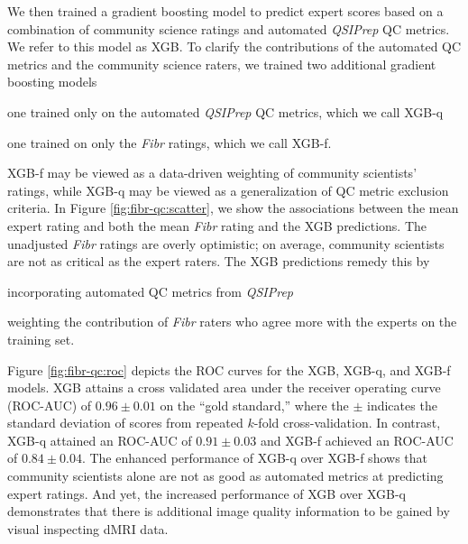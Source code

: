 \documentclass[fleqn,10pt]{wlscirep}
\begin{document}
We then trained a gradient boosting model \cite{chen2016-eb} to predict expert
scores based on a combination of community science ratings and automated \emph{QSIPrep}
QC metrics. We refer to this model as XGB.  To clarify the contributions of the
automated QC metrics and the community science raters, we trained two additional
gradient boosting models
\begin{enumerate*}[%
    label=(\roman*),%
    before=\unskip{: },%
    itemjoin={{, }},%
    itemjoin*={{ and }}]
    \item one trained only on the automated \emph{QSIPrep} QC metrics, which we
    call XGB-q
    \item one trained on only the \emph{Fibr} ratings, which we call XGB-f.
\end{enumerate*}
XGB-f may be viewed as a data-driven weighting of community scientists' ratings,
while XGB-q may be viewed as a generalization of QC metric exclusion criteria.
In Figure \ref{fig:fibr-qc:scatter}, we show the associations between the mean
expert rating and both the mean \emph{Fibr} rating and the XGB predictions.  The
unadjusted \emph{Fibr} ratings are overly optimistic; on average, community
scientists are not as critical as the expert raters. The XGB predictions remedy
this by
\begin{enumerate*}[%
    label=(\roman*),%
    before={{ }},%
    itemjoin={{, }},%
    itemjoin*={{ and }}]
    \item incorporating automated QC metrics from \emph{QSIPrep}
    \item weighting the contribution of \emph{Fibr} raters who agree more with
    the experts on the training set.
\end{enumerate*}
Figure \ref{fig:fibr-qc:roc} depicts the ROC curves for the XGB, XGB-q, and
XGB-f models.
XGB attains a cross validated area under the receiver operating curve (ROC-AUC) of
$0.96 \pm 0.01$ on the ``gold standard,'' where the $\pm$ indicates the standard
deviation of scores from repeated $k$-fold cross-validation.
In contrast, XGB-q attained an ROC-AUC of $0.91 \pm 0.03$ and XGB-f achieved an
ROC-AUC of $0.84 \pm 0.04$.
The enhanced performance of XGB-q over XGB-f shows that community scientists
alone are not as good as automated metrics at predicting expert ratings. And
yet, the increased performance of XGB over XGB-q demonstrates that there is
additional image quality information to be gained by visual inspecting dMRI
data.
\end{document}
